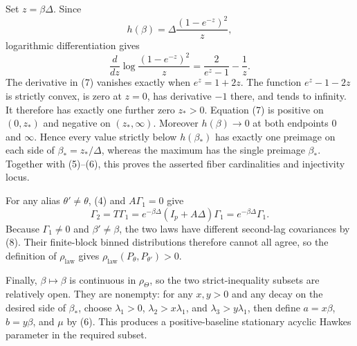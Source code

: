 Set \(z=\beta\Delta\).  Since
\[
 h(\beta)=\Delta\frac{(1-e^{-z})^2}{z},
\]
logarithmic differentiation gives
\[
 \frac{d}{dz}\log\frac{(1-e^{-z})^2}{z}
 =\frac{2}{e^z-1}-\frac1z.
\tag{7}
\]
The derivative in (7) vanishes exactly when \(e^z=1+2z\).  The function \(e^z-1-2z\) is strictly convex, is zero at \(z=0\), has derivative \(-1\) there, and tends to infinity.  It therefore has exactly one further zero \(z_*>0\).  Equation (7) is positive on \((0,z_*)\) and negative on \((z_*,\infty)\).  Moreover \(h(\beta)\to0\) at both endpoints \(0\) and \(\infty\).  Hence every value strictly below \(h(\beta_*)\) has exactly one preimage on each side of \(\beta_*=z_*/\Delta\), whereas the maximum has the single preimage \(\beta_*\).  Together with (5)--(6), this proves the asserted fiber cardinalities and injectivity locus.

For any alias \(\theta'\neq\theta\), (4) and \(A\Gamma_1=0\) give
\[
 \Gamma_2=T\Gamma_1=e^{-\beta\Delta}(I_p+A\Delta)\Gamma_1
 =e^{-\beta\Delta}\Gamma_1.
\tag{8}
\]
Because \(\Gamma_1\neq0\) and \(\beta'\neq\beta\), the two laws have different second-lag covariances by (8).  Their finite-block binned distributions therefore cannot all agree, so the definition of \(\rho_{\mathrm{law}}\) gives \(\rho_{\mathrm{law}}(P_\theta,P_{\theta'})>0\).

Finally, \(\beta\mapsto\beta\) is continuous in \(\rho_\Theta\), so the two strict-inequality subsets are relatively open.  They are nonempty: for any \(x,y>0\) and any decay on the desired side of \(\beta_*\), choose \(\lambda_1>0\), \(\lambda_2>x\lambda_1\), and \(\lambda_3>y\lambda_1\), then define \(a=x\beta\), \(b=y\beta\), and \(\mu\) by (6).  This produces a positive-baseline stationary acyclic Hawkes parameter in the required subset.
